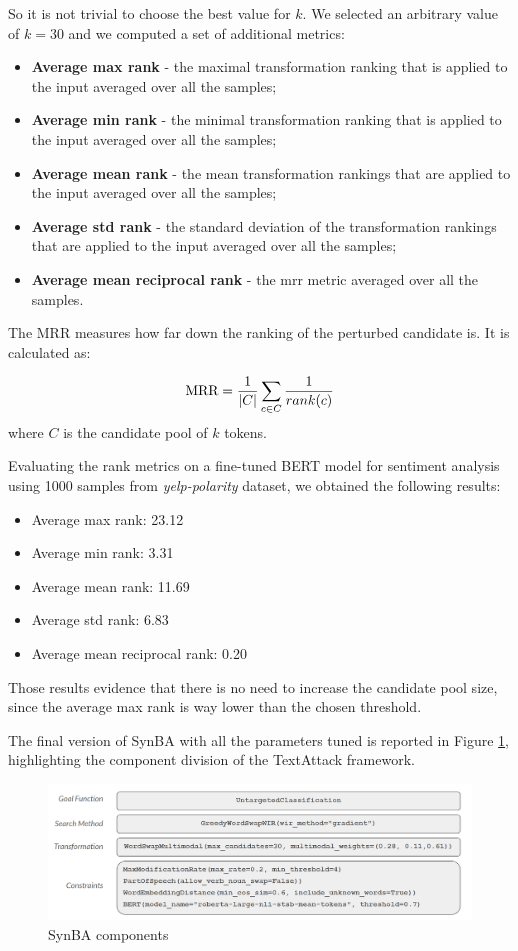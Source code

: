 So it is not trivial to choose the best value for $k$. 
We selected an arbitrary value of $k=30$ and we computed a set of additional metrics:

\begin{itemize}
    \item \textbf{Average max rank} - the maximal transformation ranking that is applied to the input averaged over all the samples;
    \item \textbf{Average min rank} - the minimal transformation ranking that is applied to the input averaged over all the samples;
    \item \textbf{Average mean rank} - the mean transformation rankings that are applied to the input averaged over all the samples;
    \item \textbf{Average std rank} - the standard deviation of the transformation rankings that are applied to the input averaged over all the samples;
    \item \textbf{Average mean reciprocal rank} - the \acrshort{mrr} metric averaged over all the samples.
\end{itemize}
The MRR measures how far down the ranking of the perturbed candidate is. It is calculated as:

\begin{equation}
    \text{MRR} = \frac{1}{|C|} \sum_{c \in C} \frac{1}{rank(c)} \\
\end{equation}
where $C$ is the candidate pool of $k$ tokens. 


Evaluating the rank metrics on a fine-tuned BERT model for sentiment analysis using 1000 samples from \emph{yelp-polarity} dataset, 
we obtained the following results:
\begin{itemize}
    \item Average max rank: 23.12
    \item Average min rank: 3.31
    \item Average mean rank: 11.69
    \item Average std rank: 6.83
    \item Average mean reciprocal rank: 0.20
\end{itemize}

Those results evidence that there is no need to increase the candidate pool size, since the average max rank is way lower than the chosen threshold.

The final version of SynBA with all the parameters tuned is reported in Figure \ref{fig:3_synba_components},
highlighting the component division of the TextAttack framework.

\begin{figure}[h]
    \centering
    \includegraphics[width=0.9\linewidth]{images/3_synba_components.png}
    \caption{SynBA components}
    \label{fig:3_synba_components}
\end{figure}